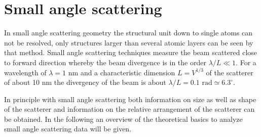 \section{Small angle scattering}

In small angle scattering geometry the structural unit down to single atoms can not be resolved,
only structures larger than several atomic layers can be seen by that method. Small angle
scattering techniques measure the beam scattered close to forward direction whereby the beam
divergence is in the order $\lambda/L \ll 1$. For a wavelength of  $\lambda = 1$ nm and
a characteristic dimension $L = V^{1/3}$ of the scatterer of about 10 nm the divergency of the beam
is  about $\lambda/L = 0.1 \mbox{ rad} \simeq 6.3^{\circ}$.

In principle with small angle scattering  both information on size as well as shape of the scatterer
and information on the relative arrangement of the scatterer can be obtained. In the following an
overview of the theoretical basics to analyze small angle scattering data will be given.


